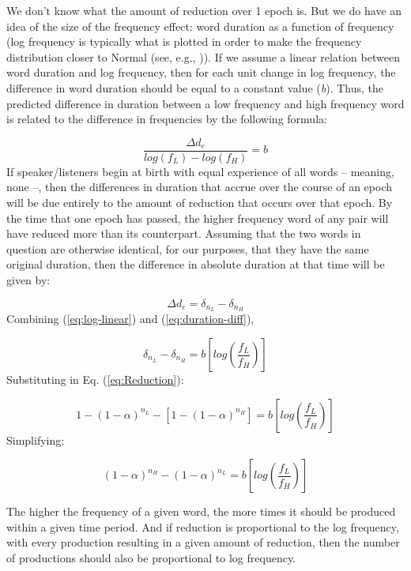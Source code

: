 We don't know what the amount of reduction over 1 epoch is. But we
do have an idea of the size of the frequency effect: word duration
as a function of frequency (log frequency is typically what is plotted
in order to make the frequency distribution closer to Normal (see,
e.g., \citet{gahl2012reduce})). If we assume a linear relation between
word duration and log frequency, then for each unit change in log
frequency, the difference in word duration should be equal to a constant
value (\emph{b}). Thus, the predicted difference in duration between
a low frequency and high frequency word is related to the difference
in frequencies by the following formula: 

\begin{equation}
\frac{\Delta d_{e}}{log(f_{L})-log(f_{H})}=b\label{eq:log-linear}
\end{equation}
If speaker/listeners begin at birth with equal experience of all words
– meaning, none –, then the differences in duration that accrue over
the course of an epoch will be due entirely to the amount of reduction
that occurs over that epoch. By the time that one epoch has passed,
the higher frequency word of any pair will have reduced more than
its counterpart. Assuming that the two words in question are otherwise
identical, for our purposes, that they have the same original duration,
then the difference in absolute duration at that time will be given
by:

\begin{equation}
\Delta d_{e}=\delta_{n_{L}}-\delta_{n_{H}}\label{eq:duration-diff}
\end{equation}
Combining (\ref{eq:log-linear}) and (\ref{eq:duration-diff}),

\begin{equation}
\delta_{n_{L}}-\delta_{n_{H}}=b[log(\frac{f_{L}}{f_{H}})]
\end{equation}
Substituting in Eq. (\ref{eq:Reduction}):

\begin{equation}
1-(1-\alpha)^{n_{L}}-[1-(1-\alpha)^{n_{H}}]=b[log(\frac{f_{L}}{f_{H}})]
\end{equation}
Simplifying:

\begin{equation}
(1-\alpha)^{n_{H}}-(1-\alpha)^{n_{L}}=b[log(\frac{f_{L}}{f_{H}})]\label{eq:reduction-to-freq}
\end{equation}

The higher the frequency of a given word, the more times it should
be produced within a given time period. And if reduction is proportional
to the log frequency, with every production resulting in a given amount
of reduction, then the number of productions should also be proportional
to log frequency. 

